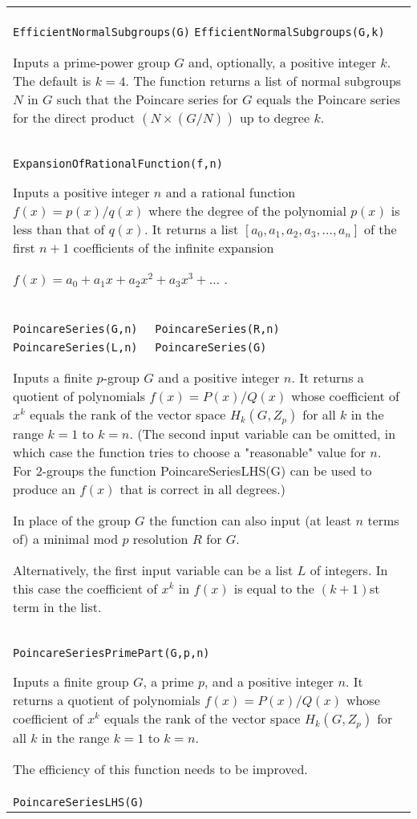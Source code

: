 \documentclass[a4paper,11pt]{report}
\begin{document}
{
 \begin{center}
\begin{tabular}{|l|} \texttt{EfficientNormalSubgroups(G)} \texttt{EfficientNormalSubgroups(G,k)} 

 Inputs a prime-power group $G$ and, optionally, a positive integer $k$. The default is $k=4$. The function returns a list of normal subgroups $N$ in $G$ such that the Poincare series for $G$ equals the Poincare series for the direct product $(N \times (G/N))$ up to degree $k$. \\
 \index{ExpansionOfRationalFunction} \texttt{ExpansionOfRationalFunction(f,n)} 

 Inputs a positive integer $n$ and a rational function $f(x)=p(x)/q(x)$ where the degree of the polynomial $p(x)$ is less than that of $q(x)$. It returns a list $[a_0 , a_1 , a_2 , a_3 , \ldots ,a_n]$ of the first $n+1$ coefficients of the infinite expansion 

 $f(x) = a_0 + a_1x + a_2x^2 + a_3x^3 + \ldots $ . \\
 \index{PoincareSeries} \texttt{PoincareSeries(G,n) } \texttt{ PoincareSeries(R,n) } \texttt{ PoincareSeries(L,n) } \texttt{ PoincareSeries(G) } 

 Inputs a finite $p$-group $G$ and a positive integer $n$. It returns a quotient of polynomials $f(x)=P(x)/Q(x)$ whose coefficient of $x^k$ equals the rank of the vector space $H_k(G,Z_p)$ for all $k$ in the range $k=1$ to $k=n$. (The second input variable can be omitted, in which case the function tries
to choose a "reasonable" value for $n$. For $2$-groups the function PoincareSeriesLHS(G) can be used to produce an $f(x)$ that is correct in all degrees.) 

 In place of the group $G$ the function can also input (at least $n$ terms of) a minimal mod $p$ resolution $R$ for $G$. 

 Alternatively, the first input variable can be a list $L$ of integers. In this case the coefficient of $x^k$ in $f(x)$ is equal to the $(k+1)$st term in the list. \\
 \index{PoincareSeriesPrimePart} \texttt{PoincareSeriesPrimePart(G,p,n) } 

 Inputs a finite group $G$, a prime $p$, and a positive integer $n$. It returns a quotient of polynomials $f(x)=P(x)/Q(x)$ whose coefficient of $x^k$ equals the rank of the vector space $H_k(G,Z_p)$ for all $k$ in the range $k=1$ to $k=n$. 

 The efficiency of this function needs to be improved. \\
 \texttt{PoincareSeriesLHS(G) } 


\end{tabular}
\end{center}}
\end{document}
